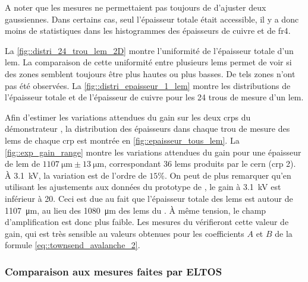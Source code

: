         A noter que les mesures ne permettaient pas toujours de d'ajuster deux gaussiennes. Dans certains cas, seul l'épaisseur totale était accessible, il y a donc moins de statistiques dans les histogrammes des épaisseurs de cuivre et de \gls{fr4}.
                
         La \autoref{fig::distri_24_trou_lem_2D} montre l'uniformité de l'épaisseur totale d'un \gls{lem}. La comparaison de cette uniformité entre plusieurs \glspl{lem} permet de voir si des zones semblent toujours être plus hautes ou plus basses. De tels zones n'ont pas été observées. La \autoref{fig::distri_epaisseur_1_lem} montre les distributions de l'épaisseur totale et de l'épaisseur de cuivre pour les 24 trous de mesure d'un \gls{lem}.
                
        Afin d'estimer les variations attendues du gain sur les deux \glspl{crp} du démonstrateur \SSS{}, la distribution des épaisseurs dans chaque trou de mesure des \glspl{lem} de chaque \gls{crp} est montrée en \autoref{fig::epaisseur_tous_lem}. La \autoref{fig::exp_gain_range} montre les variations attendues du gain pour une épaisseur de \gls{lem} de $\SI{1107}{\micro\meter}\pm\SI{13}{\micro\meter}$, correspondant 36 \glspl{lem} produits par le \gls{cern} (\gls{crp} 2). À \SI{3.1}{\kilo\volt}, la variation est de l'ordre de $15\%$. On peut de plus remarquer qu'en utilisant les ajustements aux données du prototype de \threeL{}, le gain à \SI{3.1}{\kilo\volt} est inférieur à 20. Ceci est due au fait que l'épaisseur totale des \glspl{lem} est autour de \SI{1107}{\micro\meter}, au lieu des \SI{1080}{\micro\meter} des \glspl{lem} du \threeL{}. À même tension, le champ d'amplification est donc plus faible. Les mesures du \SSS{} vérifieront cette valeur de gain, qui est très sensible au valeurs obtenues pour les coefficients $A$ et $B$ de la formule \eqref{eq::townsend_avalanche_2}.
                
                
      \subsubsection{Comparaison aux mesures faites par ELTOS}\label{sec::thickness_comparison_eltos}
            
